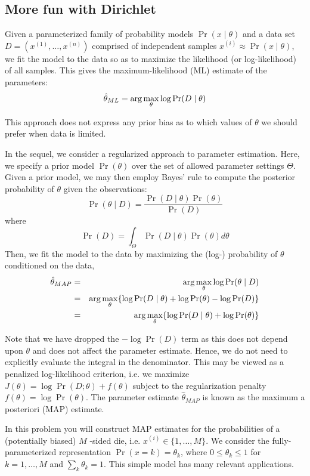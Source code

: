 \documentclass[11pt]{exam}
\begin{document}
\subsection{More fun with Dirichlet}

Given a parameterized family of probability
models $\Pr(x \mid \theta)$ and a data set $D = (x^{(1)}, \ldots , x^{(n)})$
comprised of independent samples $x^{(i)} \approx \Pr(x \mid \theta)$, we
fit the model to the data so as to maximize the likelihood (or
log-likelihood) of all samples. This gives the maximum-likelihood (ML)
estimate of the parameters:
\[\hat{\theta}_{ML} = {\rm arg} \max_{\theta} \log \Pr(D \mid \theta)	\]

This approach does not express any prior bias as to which values of $\theta$
we should prefer when data is limited. 

In the sequel, we consider a regularized approach to parameter
estimation. Here, we specify a prior model $\Pr(\theta)$ over the set of
allowed parameter settings $\Theta$. Given a prior model, we may then employ
Bayes' rule to compute the posterior probability of $\theta$ given the 
observations: 
\[\Pr(\theta \mid D) = \frac{\Pr(D \mid \theta) \Pr(\theta)}{\Pr(D)}\]
where 
\[\Pr(D) = \int_{\Theta} \Pr(D \mid \theta) \Pr(\theta) d\theta\] 
Then, we fit the model to the data by maximizing the (log-)
probability of $\theta$ conditioned  on the data, 
\begin{eqnarray*}
\hat{\theta}_{MAP} & = & {\rm arg} \max_\theta \log \Pr(\theta \mid D)\\
& = & {\rm arg} \max_\theta \{\log \Pr(D \mid \theta) + \log \Pr(\theta)-\log \Pr(D)\}\\
& = & {\rm arg} \max_\theta \{\log \Pr(D \mid \theta) + \log \Pr(\theta)\}
\end{eqnarray*}

Note that we have dropped the $-\log \Pr(D)$ term as this does not depend
upon $\theta$ and does not affect the parameter estimate. Hence, we do not
need to explicitly evaluate the integral in the denominator. This may
be viewed as a penalized log-likelihood criterion, i.e. we maximize
$J(\theta) = \log \Pr(D; \theta)+f(\theta)$ subject to the
regularization penalty $f(\theta) =\log \Pr(\theta)$. The parameter
estimate $\hat{\theta}_{MAP}$ is known as the maximum a posteriori (MAP)
estimate.  

In this problem you will construct MAP estimates for the probabilities
of a (potentially biased) $M$ -sided die, i.e. $x^{(i)} \in \{1, \ldots ,
M\}$. We consider the fully-parameterized representation $\Pr(x=k) =
\theta_k$, where $0 \leq \theta_k \leq 1$ for $k = 1, \dots,M$ and
$\sum_k \theta_k = 1$. This simple model has many relevant
applications.
\end{document}

